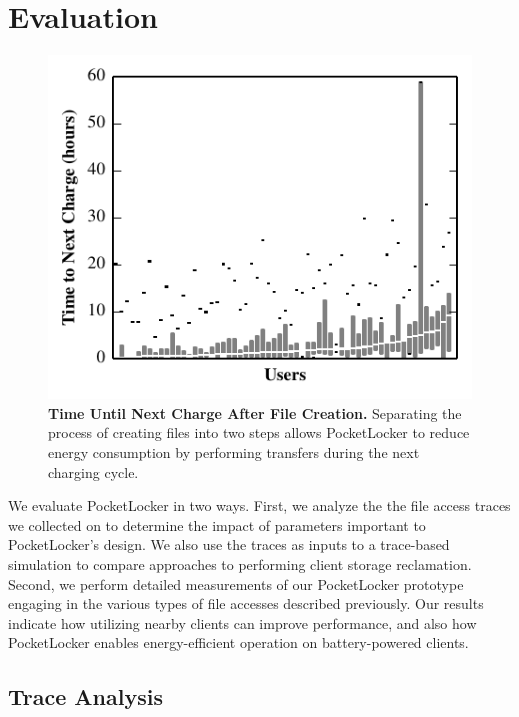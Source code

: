 
\section{Evaluation}
\label{sec-evaluation}

\begin{figure}[t]
  \includegraphics{./figures/pocketlocker/BatteryLengthDistributionGraph.pdf}
  
  \caption{\small \textbf{Time Until Next Charge After File Creation.}
    Separating the process of creating files into two steps allows
  PocketLocker to reduce energy consumption by performing transfers during
the next charging cycle.}
  
  \label{fig-simulation-battery}

\end{figure}

We evaluate PocketLocker in two ways. First, we analyze the the file access
traces we collected on \PhoneLab{} to determine the impact of parameters
important to PocketLocker's design. We also use the traces as inputs to a
trace-based simulation to compare approaches to performing client storage
reclamation. Second, we perform detailed measurements of our PocketLocker
prototype engaging in the various types of file accesses described previously.
Our results indicate how utilizing nearby clients can improve performance, and
also how PocketLocker enables energy-efficient operation on battery-powered
clients.

\subsection{Trace Analysis}
\label{subsec-evaluation-traces}

